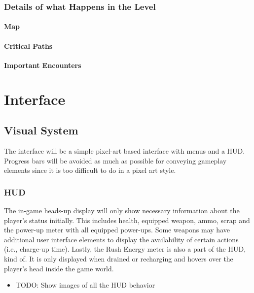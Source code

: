 \documentclass[12pt]{article}
\begin{document}
\subsubsection{Details of what Happens in the Level}

\paragraph{Map}

\paragraph{Critical Paths}

\paragraph{Important Encounters}

\section{Interface}

\subsection{Visual System}

The interface will be a simple pixel-art based interface with menus and a HUD. Progress bars will be avoided as much as possible for conveying gameplay elements since it is too difficult to do in a pixel art style. 

\subsubsection{HUD}

The in-game heads-up display will only show necessary information about the player's status initially. This includes health, equipped weapon, ammo, scrap and the power-up meter with all equipped power-ups. Some weapons may have additional user interface elements to display the availability of certain actions (i.e., charge-up time). Lastly, the Rush Energy meter is also a part of the HUD, kind of. It is only displayed when drained or recharging and hovers over the player's head inside the game world. 

\begin{itemize}
	\item TODO: Show images of all the HUD behavior
\end{itemize}
\end{document}
